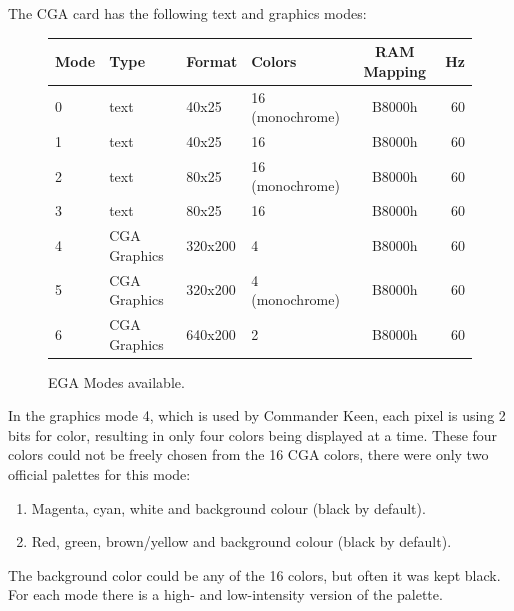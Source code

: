 \documentclass[book.tex]{subfiles}
\begin{document}
The CGA card has the following text and graphics modes:\\
\vspace{-10pt}
\begin{figure}[H]
\centering
\begin{table}[H]
\begin{tabularx}{\textwidth}[c]{llllcr}
\hline
\textbf{Mode} & \textbf{Type} & \textbf{Format} & \textbf{Colors} & \hspace{10pt}\textbf{RAM Mapping}\hspace{10pt} & \textbf{Hz}        \\ \hline
0             & text          & 40x25           & 16 (monochrome) & B8000h     & 60                           \\ \hline
1             & text          & 40x25           & 16              & B8000h    & 60                            \\ \hline
2             & text          & 80x25           & 16 (monochrome) & B8000h    & 60                            \\ \hline
3             & text          & 80x25           & 16              & B8000h    & 60                            \\ \hline
4             & CGA Graphics  & 320x200         & 4               & B8000h    & 60                            \\ \hline
5             & CGA Graphics  & 320x200         & 4 (monochrome)  & B8000h    & 60                            \\ \hline
6             & CGA Graphics  & 640x200         & 2               & B8000h    & 60                            \\ \hline

\end{tabularx}
\end{table}
\caption{EGA Modes available.}
\label{ega-modes-available}
 \end{figure} 

In the graphics mode 4, which is used by Commander Keen, each pixel is using 2 bits for color, resulting in only four colors being displayed at a time. These four colors could not be freely chosen from the 16 CGA colors, there were only two official palettes for this mode:
\begin{enumerate}
  \item Magenta, cyan, white and background colour (black by default).
  \item Red, green, brown/yellow and background colour (black by default).
\end{enumerate}
The background color could be any of the 16 colors, but often it was kept black. For each mode there is a high- and low-intensity version of the palette.\\
\end{document}
